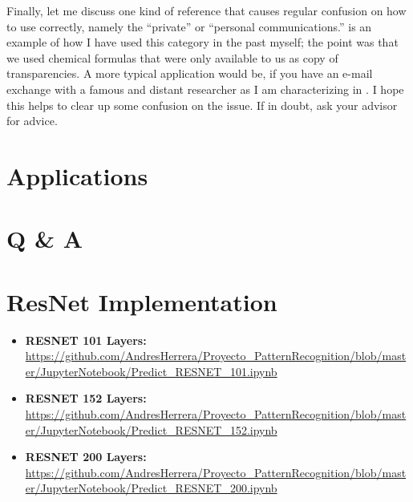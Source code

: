 \documentclass[12pt]{article}
\numberwithin{equation}{section}
\numberwithin{table}{section}
\numberwithin{figure}{section}
\begin{document}
Finally, let me discuss one kind of reference that causes regular
confusion on how to use correctly, namely the ``private'' or ``personal
communications.''
\cite{Ho95} is an example of how I have used this category in the past myself;
the point was that we used chemical formulas that were only
available to us as copy of transparencies. A more typical application
would be, if you have an e-mail exchange with a famous and distant researcher
as I am characterizing in \cite{BigShot}. I hope this helps to clear
up some confusion on the issue. If in doubt, ask your advisor for advice.

\section{Applications} \label{applications}




\section{Q \& A} \label{qa}

\section{ResNet Implementation } \label{approach}



\begin{itemize}
	\item {\textbf{RESNET 101 Layers:} } \url{https://github.com/AndresHerrera/Proyecto_PatternRecognition/blob/master/JupyterNotebook/Predict_RESNET_101.ipynb}
	
	\item {\textbf{RESNET 152 Layers:} } \url{https://github.com/AndresHerrera/Proyecto_PatternRecognition/blob/master/JupyterNotebook/Predict_RESNET_152.ipynb}
	
	\item {\textbf{RESNET 200 Layers:} } \url{https://github.com/AndresHerrera/Proyecto_PatternRecognition/blob/master/JupyterNotebook/Predict_RESNET_200.ipynb}
		
		
\end{itemize}
\end{document}
